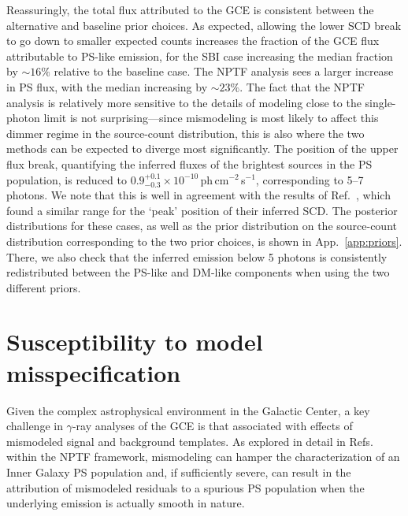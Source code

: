 \documentclass[prd,aps,10pt,nofootinbib,twocolumn,superscriptaddress,preprintnumbers,balancelastpage,longbibliography]{revtex4-1}
\begin{document}
Reassuringly, the total flux attributed to the GCE is consistent between the alternative and baseline prior choices. As expected, allowing the lower SCD break to go down to smaller expected counts increases the fraction of the GCE flux attributable to PS-like emission, for the SBI case increasing the median fraction by $\sim16\%$ relative to the baseline case. The NPTF analysis sees a larger increase in PS flux, with the median increasing by $\sim23\%$. The fact that the NPTF analysis is relatively more sensitive to the details of modeling close to the single-photon limit is not surprising---since mismodeling is most likely to affect this dimmer regime in the source-count distribution, this is also where the two methods can be expected to diverge most significantly. 
The position of the upper flux break, quantifying the inferred fluxes of the brightest sources in the PS population, is reduced to $0.9^{+0.1}_{-0.3}\times 10^{-10}$\,ph\,cm$^{-2}$\,s$^{-1}$, corresponding to 5--7\,photons. We note that this is well in agreement with the results of Ref.~\cite{List:2021aer}, which found a similar range for the `peak' position of their inferred SCD.
The posterior distributions for these cases, as well as the prior distribution on the source-count distribution corresponding to the two prior choices, is shown in App.~\ref{app:priors}. There, we also check that the inferred emission below 5 photons is consistently redistributed between the PS-like and DM-like components when using the two different priors.

\section{Susceptibility to model misspecification}
\label{sec:mismodeling}

Given the complex astrophysical environment in the Galactic Center, a key challenge in $\gamma$-ray analyses of the GCE is that associated with effects of mismodeled signal and background templates. As explored in detail in Refs.~\cite{Lee:2015fea,Leane:2020pfc,Leane:2020nmi,Buschmann:2020adf,Chang:2019ars} within the NPTF framework, mismodeling can hamper the characterization of an Inner Galaxy PS population and, if sufficiently severe, can result in the attribution of mismodeled residuals to a spurious PS population when the underlying emission is actually smooth in nature. 
\end{document}
